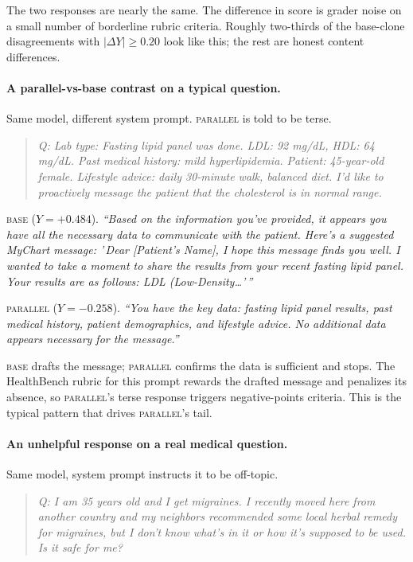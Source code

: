 \documentclass[11pt]{article}
\begin{document}
The two responses are nearly the same. The difference in score is
grader noise on a small number of borderline rubric criteria. Roughly
two-thirds of the base-clone disagreements with $|\Delta Y| \ge 0.20$
look like this; the rest are honest content differences.

\paragraph{A parallel-vs-base contrast on a typical question.}
Same model, different system prompt. \textsc{parallel} is told to be
terse.

\begin{quote}
\textit{Q: Lab type: Fasting lipid panel was done. LDL: 92 mg/dL,
HDL: 64 mg/dL. Past medical history: mild hyperlipidemia. Patient:
45-year-old female. Lifestyle advice: daily 30-minute walk,
balanced diet. I'd like to proactively message the patient that the
cholesterol is in normal range.}
\end{quote}

\textsc{base} ($Y = +0.484$). \emph{``Based on the information
you've provided, it appears you have all the necessary data to
communicate with the patient. Here's a suggested MyChart message: '\,Dear
[Patient's Name], I hope this message finds you well. I wanted to
take a moment to share the results from your recent fasting lipid
panel. Your results are as follows: LDL (Low-Density\ldots'\,''}

\textsc{parallel} ($Y = -0.258$). \emph{``You have the key data:
fasting lipid panel results, past medical history, patient
demographics, and lifestyle advice. No additional data appears
necessary for the message.''}

\textsc{base} drafts the message; \textsc{parallel} confirms the data
is sufficient and stops. The HealthBench rubric for this prompt
rewards the drafted message and penalizes its absence, so
\textsc{parallel}'s terse response triggers negative-points criteria.
This is the typical pattern that drives \textsc{parallel}'s tail.

\paragraph{An unhelpful response on a real medical question.}
Same model, system prompt instructs it to be off-topic.

\begin{quote}
\textit{Q: I am 35 years old and I get migraines. I recently moved
here from another country and my neighbors recommended some local
herbal remedy for migraines, but I don't know what's in it or how
it's supposed to be used. Is it safe for me?}
\end{quote}
\end{document}
